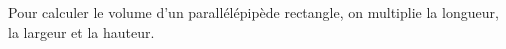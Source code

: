 Pour calculer le volume d'un parallélépipède rectangle, on
multiplie la longueur, la largeur et la hauteur.